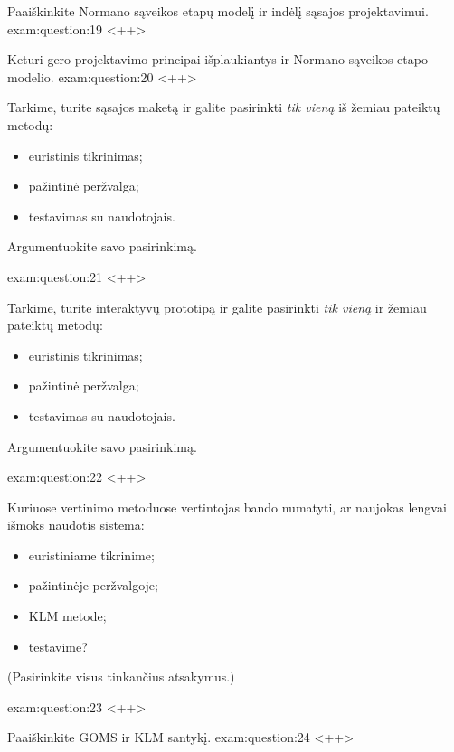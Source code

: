 \begin{question}{%
  Paaiškinkite Normano sąveikos etapų modelį ir indėlį sąsajos
  projektavimui.
  }{exam:question:19}
  <++>
\end{question}

\begin{question}{%
  Keturi gero projektavimo principai išplaukiantys ir Normano sąveikos
  etapo modelio.
  }{exam:question:20}
  <++>
\end{question}

\begin{question}{%
  Tarkime, turite sąsajos maketą ir galite pasirinkti \emph{tik vieną}
  iš žemiau pateiktų metodų:
  \begin{itemize}
    \item euristinis tikrinimas;
    \item pažintinė peržvalga;
    \item testavimas su naudotojais.
  \end{itemize}
  Argumentuokite savo pasirinkimą.
  }{exam:question:21}
  <++>
\end{question}

\begin{question}{%
  Tarkime, turite interaktyvų prototipą ir galite pasirinkti \emph{tik
  vieną} ir žemiau pateiktų metodų:
  \begin{itemize}
    \item euristinis tikrinimas;
    \item pažintinė peržvalga;
    \item testavimas su naudotojais.
  \end{itemize}
  Argumentuokite savo pasirinkimą.
  }{exam:question:22}
  <++>
\end{question}

\begin{question}{%
  Kuriuose vertinimo metoduose vertintojas bando numatyti, ar naujokas
  lengvai išmoks naudotis sistema:
  \begin{itemize}
    \item euristiniame tikrinime;
    \item pažintinėje peržvalgoje;
    \item KLM metode;
    \item testavime?
  \end{itemize}
  (Pasirinkite visus tinkančius atsakymus.)
  }{exam:question:23}
  <++>
\end{question}

\begin{question}{%
  Paaiškinkite GOMS ir KLM santykį.
  }{exam:question:24}
  <++>
\end{question}

